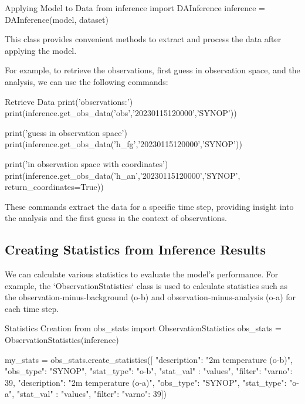 \begin{codeonly}{Applying Model to Data}
from inference import DAInference
inference = DAInference(model, dataset)
\end{codeonly}

This class provides convenient methods to extract and process the data after applying the model.

For example, to retrieve the observations, first guess in observation space, and the analysis, we can use the following commands:

\begin{codeonly}{Retrieve Data}
print('observations:')
print(inference.get_obs_data('obs','20230115120000','SYNOP'))

print('\nfirst guess in observation space')
print(inference.get_obs_data('h_fg','20230115120000','SYNOP'))

print('\nanalysis in observation space with coordinates')
print(inference.get_obs_data('h_an','20230115120000','SYNOP', return_coordinates=True))
\end{codeonly}

These commands extract the data for a specific time step, providing insight into the analysis and the first guess in the context of observations.

%
\subsection{Creating Statistics from Inference Results}

We can calculate various statistics to evaluate the model’s performance. For example, the `ObservationStatistics` class is used to calculate statistics such as the observation-minus-background (o-b) and observation-minus-analysis (o-a) for each time step.

\begin{codeonly}{Statistics Creation}
from obs_stats import ObservationStatistics
obs_stats = ObservationStatistics(inference)

my_stats = obs_stats.create_statistics([
        {"description": "2m temperature (o-b)", "obs_type": "SYNOP", "stat_type": "o-b", "stat_val" : "values", "filter": {"varno": 39}},
        {"description": "2m temperature (o-a)", "obs_type": "SYNOP", "stat_type": "o-a", "stat_val" : "values", "filter": {"varno": 39}}])
\end{codeonly}

